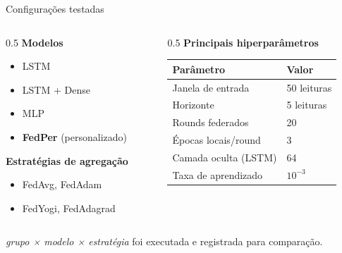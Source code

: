 \documentclass[aspectratio=169,11pt]{beamer}
\begin{document}
\begin{frame}{Configurações testadas}
  \begin{columns}[T]
    \begin{column}{0.5\textwidth}
      \textbf{Modelos}
      \begin{itemize}
        \item LSTM
        \item LSTM + Dense
        \item MLP
        \item \textbf{FedPer} (personalizado)
      \end{itemize}
      \medskip
      \textbf{Estratégias de agregação}
      \begin{itemize}
        \item FedAvg, FedAdam
        \item FedYogi, FedAdagrad
      \end{itemize}
    \end{column}
    \begin{column}{0.5\textwidth}
      \textbf{Principais hiperparâmetros}
      \centering \small
      \begin{tabular}{ll}
        \toprule
        Parâmetro & Valor \\
        \midrule
        Janela de entrada    & 50 leituras \\
        Horizonte            & 5 leituras \\
        Rounds federados     & 20 \\
        Épocas locais/round  & 3 \\
        Camada oculta (LSTM) & 64 \\
        Taxa de aprendizado  & $10^{-3}$ \\
        \bottomrule
      \end{tabular}
    \end{column}
  \end{columns}
  \vspace{4pt}
  \footnotesize \emph{grupo × modelo × estratégia} foi executada e
  registrada para comparação.
\end{frame}
\end{document}
